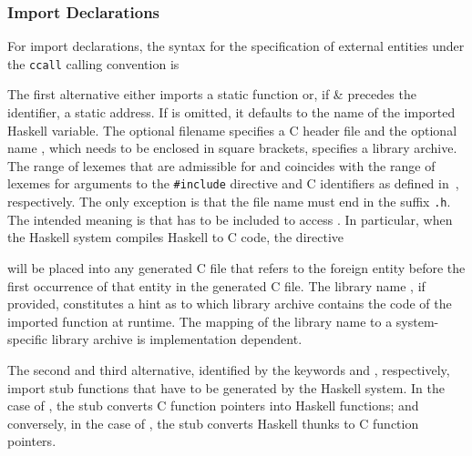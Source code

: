 \documentclass[a4paper,twosides]{article}
\newcommand{\code}[1]{\texttt{#1}}      %
\begin{document}
\subsubsection{Import Declarations}

For import declarations, the syntax for the specification of external entities
under the \code{ccall} calling convention is
%
\begin{grammar}
  \grule{fname}{%
    \gverbal{file name with suffix `\code{.h}'}}
\end{grammar}
%
The first alternative either imports a static function  or, if
\gterm\& precedes the identifier, a static address.  If  is
omitted, it defaults to the name of the imported Haskell variable.  The
optional filename  specifies a C header file and the optional
name , which needs to be enclosed in square brackets, specifies a
library archive.  The range of lexemes that are admissible for 
and  coincides with the range of lexemes for arguments to the
\code{\#{}include} directive and C identifiers as defined in~\cite{C},
respectively.  The only exception is that the file name  must
end in the suffix \code{.h}.  The intended meaning is that  has
to be included to access .  In particular, when the Haskell system
compiles Haskell to C code, the directive
%
\begin{quote}
\end{quote}
%
will be placed into any generated C file that refers to the foreign entity
before the first occurrence of that entity in the generated C file.  The
library name , if provided, constitutes a hint as to which library
archive contains the code of the imported function at runtime.  The mapping of
the library name to a system-specific library archive is implementation
dependent.

The second and third alternative, identified by the keywords 
and , respectively, import stub functions that have to be
generated by the Haskell system.  In the case of , the stub
converts C function pointers into Haskell functions; and conversely, in the
case of , the stub converts Haskell thunks to C function
pointers.
\end{document}
